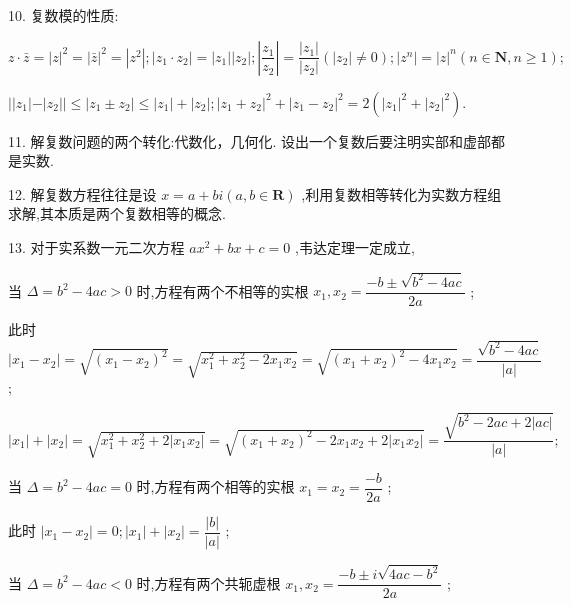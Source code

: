 10. 复数模的性质:

$z \cdot  \bar{z} = {\left| z\right| }^{2} = {\left| \bar{z}\right| }^{2} = \left| {z}^{2}\right| ;\left| {{z}_{1} \cdot  {z}_{2}}\right|  = \left| {z}_{1}\right| \left| {z}_{2}\right| ;\left| \dfrac{{z}_{1}}{{z}_{2}}\right|  = \dfrac{\left| {z}_{1}\right| }{\left| {z}_{2}\right| }\left( {\left| {z}_{2}\right|  \neq  0}\right) ;\left| {z}^{n}\right|  = {\left| z\right| }^{n}\left( {n \in  \mathbf{N},n \geq  1}\right) ;$

$\left| \right| {z}_{1}\left| -\right| {z}_{2}\left| \right|  \leq  \left| {{z}_{1} \pm  {z}_{2}}\right|  \leq  \left| {z}_{1}\right|  + \left| {z}_{2}\right| ;{\left| {z}_{1} + {z}_{2}\right| }^{2} + {\left| {z}_{1} - {z}_{2}\right| }^{2} = 2\left( {{\left| {z}_{1}\right| }^{2} + {\left| {z}_{2}\right| }^{2}}\right) .$

11. 解复数问题的两个转化:代数化，几何化. 设出一个复数后要注明实部和虚部都是实数.

12. 解复数方程往往是设 $x = a + b{i}\left( {a,b \in  \mathbf{R}}\right)$ ,利用复数相等转化为实数方程组求解,其本质是两个复数相等的概念.

13. 对于实系数一元二次方程 $a{x}^{2} + {bx} + c = 0$ ,韦达定理一定成立,

   当 $\Delta  = {b}^{2} - {4ac} > 0$ 时,方程有两个不相等的实根 ${x}_{1},{x}_{2} = \dfrac{-b \pm  \sqrt{{b}^{2} - {4ac}}}{2a}$ ;

此时 $\left| {{x}_{1} - {x}_{2}}\right|  = \sqrt{{\left( {x}_{1} - {x}_{2}\right) }^{2}} = \sqrt{{x}_{1}^{2} + {x}_{2}^{2} - 2{x}_{1}{x}_{2}} = \sqrt{{\left( {x}_{1} + {x}_{2}\right) }^{2} - 4{x}_{1}{x}_{2}} = \dfrac{\sqrt{{b}^{2} - {4ac}}}{\left| a\right| }$ ;

$\left| {x}_{1}\right|  + \left| {x}_{2}\right|  = \sqrt{{x}_{1}^{2} + {x}_{2}^{2} + 2\left| {{x}_{1}{x}_{2}}\right| } = \sqrt{{\left( {x}_{1} + {x}_{2}\right) }^{2} - 2{x}_{1}{x}_{2} + 2\left| {{x}_{1}{x}_{2}}\right| } = \dfrac{\sqrt{{b}^{2} - {2ac} + 2\left| {ac}\right| }}{\left| a\right| };$

   当 $\Delta  = {b}^{2} - {4ac} = 0$ 时,方程有两个相等的实根 ${x}_{1} = {x}_{2} = \dfrac{-b}{2a}$ ;

此时 $\left| {{x}_{1} - {x}_{2}}\right|  = 0;\left| {x}_{1}\right|  + \left| {x}_{2}\right|  = \dfrac{\left| b\right| }{\left| a\right| }$ ;

   当 $\Delta  = {b}^{2} - {4ac} < 0$ 时,方程有两个共轭虚根 ${x}_{1},{x}_{2} = \dfrac{-b \pm  {i}\sqrt{{4ac} - {b}^{2}}}{2a}$ ;

